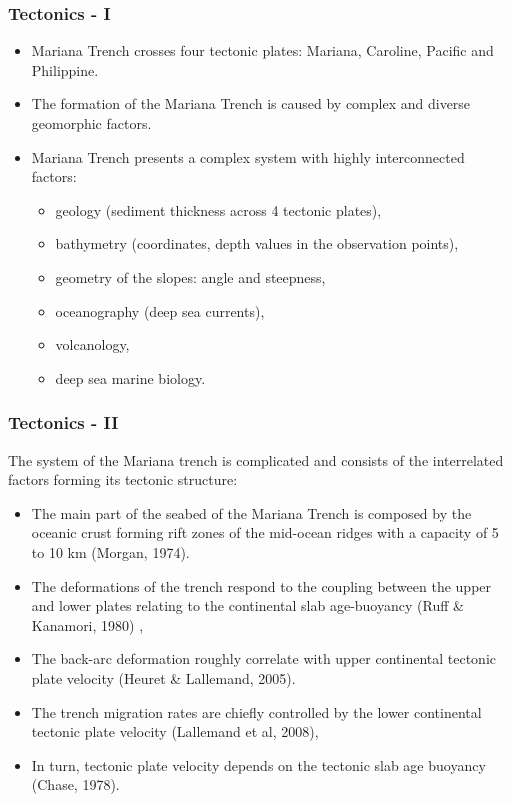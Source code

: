 \documentclass[pdflatex,compress,10pt,
	xcolor={dvipsnames,dvipsnames,svgnames,x11names,table},
	hyperref={colorlinks = true,breaklinks = true, urlcolor = NavyBlue, breaklinks = true}]{beamer}
\begin{document}
\begin{frame}\frametitle{Tectonics - I}
\begin{itemize}
    \item Mariana Trench crosses four tectonic plates: Mariana, Caroline, Pacific and Philippine. 
    \item The formation of the Mariana Trench is caused by complex and diverse geomorphic factors. 
    \item Mariana Trench presents a complex system with highly interconnected factors: 
    	 \begin{itemize}
            	\item geology (sediment thickness across 4 tectonic plates), 
            	\item bathymetry (coordinates, depth values in the observation points), 
           	 \item geometry of the slopes: angle and steepness, 
           	 \item oceanography (deep sea currents), 
           	 \item volcanology,
            	\item deep sea marine biology. 
           \end{itemize}
\end{itemize}
\end{frame}

\begin{frame}\frametitle{Tectonics - II}
The system of the Mariana trench is complicated and consists of the interrelated factors forming its tectonic structure:
 \begin{itemize}
            \item The main part of the seabed of the Mariana Trench is composed by the oceanic crust forming rift zones of the mid-ocean ridges with a capacity of 5 to 10 km (Morgan, 1974). 
            \item The deformations of the trench respond to the coupling between the upper and lower plates relating to the continental slab age-buoyancy (Ruff \& Kanamori, 1980) ,
            \item The back-arc deformation roughly correlate with upper continental tectonic plate velocity (Heuret \& Lallemand, 2005). 
            \item The trench migration rates are chiefly controlled by the lower continental tectonic plate velocity (Lallemand et al, 2008), 
            \item In turn, tectonic plate velocity depends on the tectonic slab age buoyancy (Chase, 1978).
\end{itemize}
\end{frame}
\end{document}
